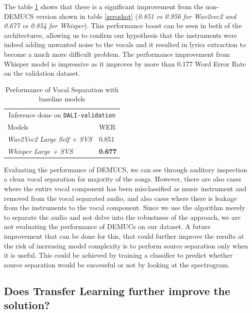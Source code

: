 The table \ref{demucsperformance}  shows that there is a significant improvement from the non-DEMUCS version shown in table \ref{zeroshot} (\textit{0.851 vs 0.956 for Wav2vec2 and 0.677 vs 0.854 for Whisper}). This performance boost can be seen in both of the architectures, allowing us to confirm our hypothesis that the instruments were indeed adding unwanted noise to the vocals and it resulted in lyrics extraction to become a much more difficult problem. The performance improvement from Whisper model is impressive as it improves by more than 0.177  Word Error Rate on the validation dataset. \\


\renewcommand{\arraystretch}{2}
\setlength{\arrayrulewidth}{0.3mm}
\begin{table}[H]
\small
\begin{center}
\begin{tabular}{ |p{7cm}| p{3cm}| }
\multicolumn{2}{c}{Inference done on \texttt{DALI-validation}} \\
\cline{1-2}
 Models     & WER  \\
\hline  \hline
 \textit{Wav2Vec2 Large Self + SVS}    & 0.851 \\
 \textit{Whisper Large + SVS}   & \textbf{0.677} \\
\hline  \hline
\end{tabular}
\caption{\label{demucsperformance} Performance of Vocal Separation with baseline models}
\end{center}
\end{table}


Evaluating the performance of DEMUCS, we can see through auditory inspection a clean vocal separation for majority of the songs. However, there are also cases where the entire vocal component has been misclassified as music instrument and removed from the vocal separated audio, and also cases where there is leakage from the instruments to the vocal component. Since we use the algorithm merely to separate the audio and not delve into the robustness of the approach, we are not evaluating the performance of DEMUCs on our dataset. A future improvement that can be done for this, that could further improve the results at the risk of increasing model complexity is to perform source separation only when it is useful. This could be achieved by training a classifier to predict whether source separation would be successful or not by looking at the spectrogram.


\subsection{Does Transfer Learning further improve the solution?}

